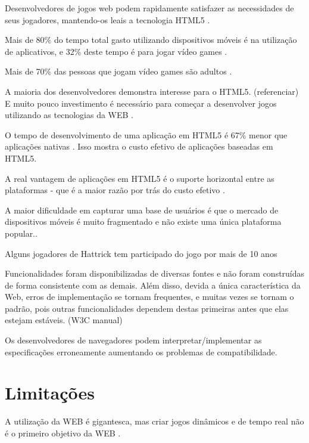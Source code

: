 

Desenvolvedores de jogos web podem rapidamente satisfazer as
necessidades de seus jogadores, mantendo-os leais a tecnologia HTML5
\autocite{developingEffect}.

Mais de 80\% do tempo total gasto utilizando dispositivos móveis é na
utilização de aplicativos, e 32\% deste tempo é para jogar vídeo
games \autocite{HTML5CrossPlatformGameDevelopment}.

Mais de 70\% das pessoas que jogam vídeo games são adultos
\autocite{gamebenefits}.

A maioria dos desenvolvedores demonstra interesse para o HTML5.
(referenciar) E muito pouco investimento é necessário para
começar a desenvolver jogos utilizando as tecnologias da WEB
\autocite{html5mostwanted}.

O tempo de desenvolvimento de uma aplicação em HTML5 é 67\% menor que
aplicações nativas \autocite[pp. 460]{html5Tradeoffs}. Isso mostra o
custo efetivo de aplicações baseadas em HTML5.

A real vantagem de aplicações em HTML5 é o suporte horizontal entre
as plataformas - que é a maior razão por trás do custo efetivo
\autocite{html5Tradeoffs}.

A maior dificuldade em capturar uma base de usuários é que o mercado
de dispositivos móveis é muito fragmentado e não existe uma única
plataforma popular.\autocite{html5Tradeoffs}.

Alguns jogadores de Hattrick tem participado do jogo por mais de 
10 anos \autocite{gameCommunities}

Funcionalidades foram disponibilizadas de diversas fontes e não foram
construídas de forma consistente com as demais. Além disso,
devida a única característica da Web, erros de implementação se
tornam frequentes, e muitas vezes se tornam o padrão, pois outras
funcionalidades dependem destas primeiras antes que elas estejam
estáveis. (W3C manual)

Os desenvolvedores de navegadores podem interpretar/implementar
as especificações erroneamente aumentando os problemas de
compatibilidade.

\section{Limitações}

A utilização da WEB é gigantesca, mas criar jogos
dinâmicos e de tempo real não é o primeiro objetivo da WEB
\autocite{html5mostwanted}.

